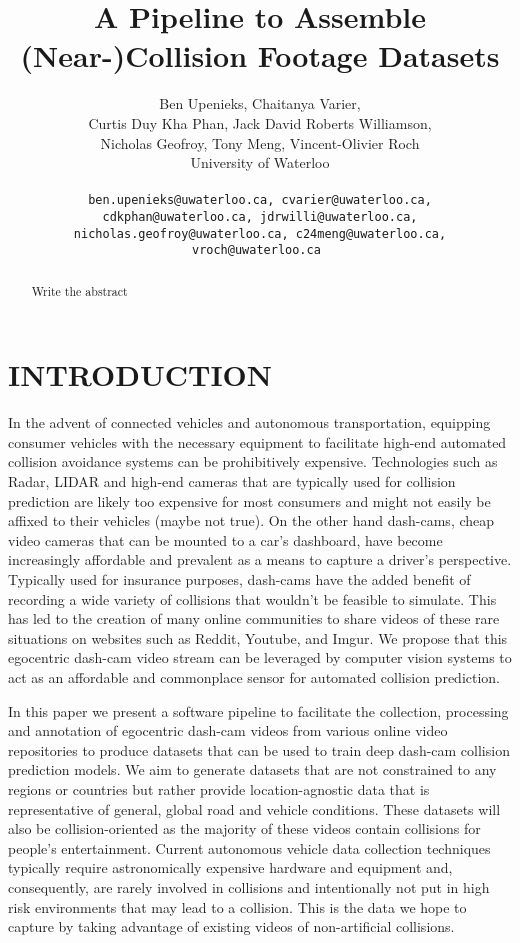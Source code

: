 \documentclass[letterpaper, 10 pt, conference]{IEEEconf}
\title{\LARGE \bf
A Pipeline to Assemble (Near-)Collision Footage Datasets
}
\author{
         Ben Upenieks, Chaitanya Varier,\\
         Curtis Duy Kha Phan, Jack David Roberts Williamson,\\
         Nicholas Geofroy, Tony Meng, Vincent-Olivier Roch\\
         University of Waterloo\\
         \\
         \tt\small ben.upenieks@uwaterloo.ca, cvarier@uwaterloo.ca,
         \\ \tt\small cdkphan@uwaterloo.ca, jdrwilli@uwaterloo.ca,
         \\ \tt\small nicholas.geofroy@uwaterloo.ca, c24meng@uwaterloo.ca, vroch@uwaterloo.ca
}
\newcommand{\todo}[1]{{\color{red}#1}}
\begin{document}
\maketitle
\thispagestyle{empty}
\pagestyle{empty}


\begin{abstract}

\todo{Write the abstract}

\end{abstract}

\section{INTRODUCTION}

In the advent of connected vehicles and autonomous transportation, equipping consumer vehicles with the necessary equipment to facilitate high-end automated collision avoidance systems can be prohibitively expensive.
Technologies such as Radar, LIDAR and high-end cameras that are typically used for collision prediction are likely too expensive for most consumers and might not easily be affixed to their vehicles (maybe not true).
On the other hand dash-cams, cheap video cameras that can be mounted to a car's dashboard, have become increasingly affordable and prevalent as a means to capture a driver’s perspective.
Typically used for insurance purposes, dash-cams have the added benefit of recording a wide variety of collisions that wouldn't be feasible to simulate. 
This has led to the creation of many online communities to share videos of these rare situations on websites such as Reddit, Youtube, and Imgur.
We propose that this egocentric dash-cam video stream can be leveraged by computer vision systems to act as an affordable and commonplace sensor for automated collision prediction. 

In this paper we present a software pipeline to facilitate the collection, processing and annotation of egocentric dash-cam videos from various online video repositories to produce datasets that can be used to train deep dash-cam collision prediction models.
We aim to generate datasets that are not constrained to any regions or countries but rather provide location-agnostic data that is representative of general, global road and vehicle conditions.
These datasets will also be collision-oriented as the majority of these videos contain collisions for people's entertainment.
Current autonomous vehicle data collection techniques typically require astronomically expensive hardware and equipment and, consequently, are rarely involved in collisions and intentionally not put in high risk environments that may lead to a collision.
This is the data we hope to capture by taking advantage of existing videos of non-artificial collisions.
\end{document}
